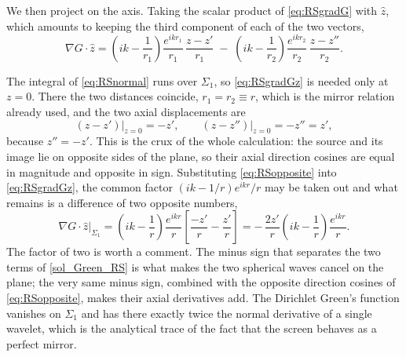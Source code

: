 		We then project on the axis. Taking the scalar product of \eqref{eq:RSgradG} with $\hat{z}$, which amounts to keeping the third component of each of the two vectors,
		\begin{equation}\label{eq:RSgradGz}
			\nabla G\cdot\hat{z} = \left(ik-\dfrac{1}{r_{1}}\right)\dfrac{e^{ikr_{1}}}{r_{1}}\,\dfrac{z-z'}{r_{1}} \;-\; \left(ik-\dfrac{1}{r_{2}}\right)\dfrac{e^{ikr_{2}}}{r_{2}}\,\dfrac{z-z''}{r_{2}} .
		\end{equation}

		The integral of \eqref{eq:RSnormal} runs over $\Sigma_{1}$, so \eqref{eq:RSgradGz} is needed only at $z=0$. There the two distances coincide, $r_{1} = r_{2} \equiv r$, which is the mirror relation already used, and the two axial displacements are
		\begin{equation}\label{eq:RSopposite}
			\left.\left(z-z'\right)\right|_{z=0} = -z', \qquad \left.\left(z-z''\right)\right|_{z=0} = -z'' = z' ,
		\end{equation}
		because $z'' = -z'$. This is the crux of the whole calculation: the source and its image lie on opposite sides of the plane, so their axial direction cosines are equal in magnitude and opposite in sign. Substituting \eqref{eq:RSopposite} into \eqref{eq:RSgradGz}, the common factor $\left(ik-1/r\right)e^{ikr}/r$ may be taken out and what remains is a difference of two opposite numbers,
		\begin{equation}\label{eq:RSgradGplane}
			\left.\nabla G\cdot\hat{z}\right|_{\Sigma_{1}} = \left(ik-\dfrac{1}{r}\right)\dfrac{e^{ikr}}{r}\left[\dfrac{-z'}{r} - \dfrac{z'}{r}\right] = -\,\dfrac{2z'}{r}\left(ik-\dfrac{1}{r}\right)\dfrac{e^{ikr}}{r} .
		\end{equation}
		The factor of two is worth a comment. The minus sign that separates the two terms of \eqref{sol_Green_RS} is what makes the two spherical waves cancel on the plane; the very same minus sign, combined with the opposite direction cosines of \eqref{eq:RSopposite}, makes their axial derivatives add. The Dirichlet Green's function vanishes on $\Sigma_{1}$ and has there exactly twice the normal derivative of a single wavelet, which is the analytical trace of the fact that the screen behaves as a perfect mirror.


